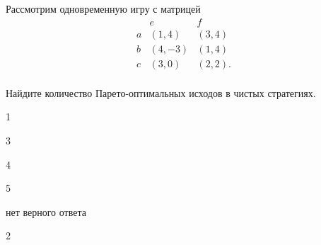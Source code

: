 
\begin{question}
Рассмотрим одновременную игру с матрицей \[
\begin{matrix}
   & e & f \\
a  & (1, 4) & (3, 4) \\
b  & (4, -3) & (1, 4) \\
c  & (3, 0) & (2, 2). \\
\end{matrix}
\]

Найдите количество Парето-оптимальных исходов в чистых стратегиях.
\begin{answerlist}
  \item 1
  \item 3
  \item 4
  \item 5
  \item нет верного ответа
  \item 2
\end{answerlist}
\end{question}


